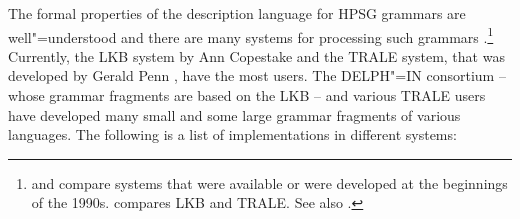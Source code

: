 The formal properties of the description language for HPSG grammars are well"=understood and there are
many systems for processing such grammars
\citep*{DS91a,%
DD93a-u,%
PV91a-u,%
DISCO94,%
%
Erbach95a,%
Schuetz96,STRD96a-u,%
SRTD96a,%
UBCCDDEEMMO-96a,Babel,Mueller2004b,%
CP96,PC99,%
GMG97a-u,%
Copestake2002a,%
Callmeier00a-u,%
Dahlloef2003a-u,%
MPR2002a-u,Penn2004a-u,%
Mueller2007b,%
Sato2008a-u,%
Kaufmann2009a-u,%
Slayden2012a-u,%
Packard2015a-u%
}.\footnote{%
\citet{UBCCDDEEMMO-96a} and \citet{Bolc:Czuba:ea:96a-u} compare systems that were available or were
developed at the beginnings of the 1990s. \citet{MelnikHandWritten}
compares LKB and TRALE. See also .
}
Currently, the LKB system by Ann Copestake and the TRALE
system, that was developed by Gerald Penn \citep*{MPR2002a-u,Penn2004a-u}, have the most users. The
DELPH"=IN consortium -- whose grammar fragments are based on the LKB -- and various TRALE users have developed many small and some
large grammar fragments of various languages. The following is a list of implementations in different systems:

